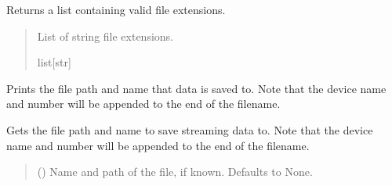 \documentclass[letterpaper,10pt,english]{sphinxmanual}
\begin{document}
\begin{fulllineitems}
\begin{fulllineitems}
\label{\detokenize{Setup_PodInterface:Setup_PodInterface.Setup_Interface.GetSupportedFileExtensions}}
\pysigstartsignatures
{}
\pysigstopsignatures
\sphinxAtStartPar
Returns a list containing valid file extensions.
\begin{quote}\begin{description}
\sphinxAtStartPar
List of string file extensions.

\sphinxAtStartPar
list{[}str{]}

\end{description}\end{quote}

\end{fulllineitems}


\begin{fulllineitems}
\label{\detokenize{Setup_PodInterface:Setup_PodInterface.Setup_Interface.PrintSaveFile}}
\pysigstartsignatures
{}
\pysigstopsignatures
\sphinxAtStartPar
Prints the file path and name that data is saved to. Note that the device name and number         will be appended to the end of the filename.

\end{fulllineitems}


\begin{fulllineitems}
\label{\detokenize{Setup_PodInterface:Setup_PodInterface.Setup_Interface.SetupFileName}}
\pysigstartsignatures
{}
\pysigstopsignatures
\sphinxAtStartPar
Gets the file path and name to save streaming data to. Note that the device name and number         will be appended to the end of the filename.
\begin{quote}\begin{description}
\sphinxAtStartPar
{} (\sphinxstyleliteralemphasis{\sphinxupquote{ | }}\sphinxstyleliteralemphasis{\sphinxupquote{, }}) \textendash{} Name and path of the file, if known. Defaults to None.


\end{description}
\end{quote}
\end{fulllineitems}
\end{fulllineitems}
\end{document}

